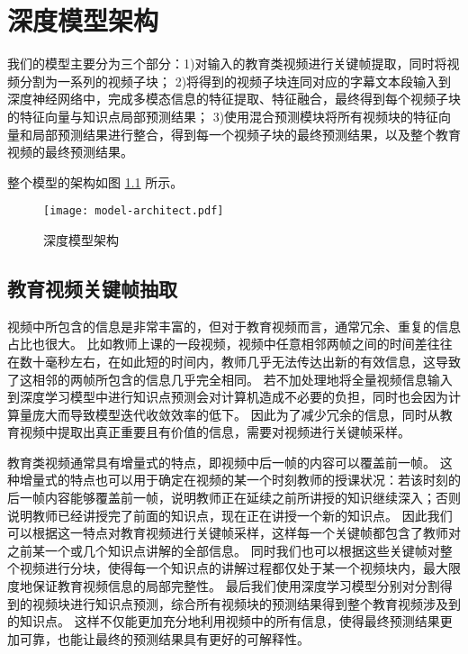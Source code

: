 \chapter{深度模型架构}
    我们的模型主要分为三个部分：1)对输入的教育类视频进行关键帧提取，同时将视频分割为一系列的视频子块；
    2)将得到的视频子块连同对应的字幕文本段输入到深度神经网络中，完成多模态信息的特征提取、特征融合，最终得到每个视频子块的特征向量与知识点局部预测结果；
    3)使用混合预测模块将所有视频块的特征向量和局部预测结果进行整合，得到每一个视频子块的最终预测结果，以及整个教育视频的最终预测结果。

    整个模型的架构如图 \ref{fig3.1} 所示。
    
    \begin{figure}[t]
        \centering
        \texttt{[image: model-architect.pdf]}
        \caption{深度模型架构}
        \label{fig3.1}
    \end{figure}

\section{教育视频关键帧抽取}
    视频中所包含的信息是非常丰富的，但对于教育视频而言，通常冗余、重复的信息占比也很大。
    比如教师上课的一段视频，视频中任意相邻两帧之间的时间差往往在数十毫秒左右，在如此短的时间内，教师几乎无法传达出新的有效信息，这导致了这相邻的两帧所包含的信息几乎完全相同。
    若不加处理地将全量视频信息输入到深度学习模型中进行知识点预测会对计算机造成不必要的负担，同时也会因为计算量庞大而导致模型迭代收敛效率的低下。
    因此为了减少冗余的信息，同时从教育视频中提取出真正重要且有价值的信息，需要对视频进行关键帧采样。

    教育类视频通常具有增量式\cite{Wang2020FineGrainedSM}的特点，即视频中后一帧的内容可以覆盖前一帧。
    这种增量式的特点也可以用于确定在视频的某一个时刻教师的授课状况：若该时刻的后一帧内容能够覆盖前一帧，说明教师正在延续之前所讲授的知识继续深入；否则说明教师已经讲授完了前面的知识点，现在正在讲授一个新的知识点。
    因此我们可以根据这一特点对教育视频进行关键帧采样，这样每一个关键帧都包含了教师对之前某一个或几个知识点讲解的全部信息。
    同时我们也可以根据这些关键帧对整个视频进行分块，使得每一个知识点的讲解过程都仅处于某一个视频块内，最大限度地保证教育视频信息的局部完整性。
    最后我们使用深度学习模型分别对分割得到的视频块进行知识点预测，综合所有视频块的预测结果得到整个教育视频涉及到的知识点。
    这样不仅能更加充分地利用视频中的所有信息，使得最终预测结果更加可靠，也能让最终的预测结果具有更好的可解释性。

